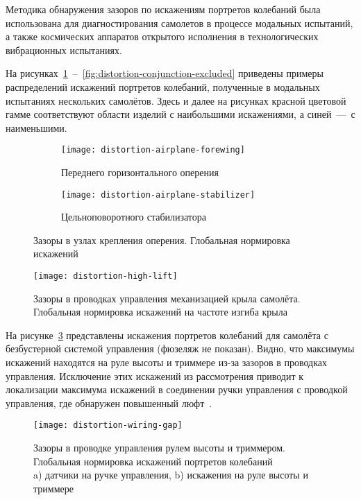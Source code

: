 Методика обнаружения зазоров по искажениям портретов колебаний была использована для диагностирования самолетов в процессе модальных испытаний, а также космических аппаратов открытого исполнения в технологических вибрационных испытаниях. 

На рисунках~\ref{fig:distortion-airplane}~--~\ref{fig:distortion-conjunction-excluded} приведены примеры распределений искажений портретов колебаний, полученные в модальных испытаниях нескольких самолётов. Здесь и далее на рисунках красной цветовой гамме соответствуют области изделий с наибольшими искажениями, а синей~---~с наименьшими. 

\begin{figure}[!htb]
	\centerfloat
	\begin{subfigure}[t]{\sfDefects}
		\texttt{[image: distortion-airplane-forewing]}
		\caption{Переднего горизонтального оперения}
	\end{subfigure}
	\hfill
	\begin{subfigure}[t]{\sfDefects}
		\texttt{[image: distortion-airplane-stabilizer]} 
		\caption{Цельноповоротного стабилизатора}
	\end{subfigure}
    \caption{Зазоры в узлах крепления оперения. Глобальная нормировка искажений} \label{fig:distortion-airplane}
\end{figure}

\begin{figure}[!htb]
	\centerfloat
	\texttt{[image: distortion-high-lift]}
	\caption{Зазоры в проводках управления механизацией крыла самолёта. Глобальная нормировка искажений на частоте изгиба крыла} \label{fig:distortion-high-lift}
\end{figure}

На рисунке~\ref{fig:distortion-wiring-gap} представлены искажения портретов колебаний для самолёта с безбустерной системой управления (фюзеляж не показан). Видно, что максимумы искажений находятся на руле высоты и триммере из-за зазоров в проводках управления. Исключение этих искажений из рассмотрения приводит к локализации максимума искажений в соединении ручки управления с проводкой управления, где обнаружен повышенный люфт~.

\begin{figure}[!htb]
	\centerfloat
	\texttt{[image: distortion-wiring-gap]}
	\caption{Зазоры в проводке управления рулем высоты и триммером. Глобальная нормировка искажений портретов колебаний \\ a) датчики на ручке управления, b) искажения на руле высоты и триммере} \label{fig:distortion-wiring-gap}
\end{figure}

